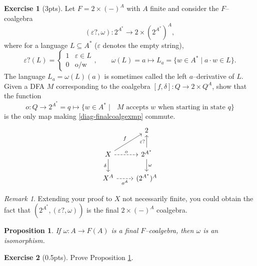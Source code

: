 \documentclass{article}
\newtheorem{prop}[thm]{Proposition}
\theoremstyle{definition}
\newtheorem{exer}{Exercise}
\theoremstyle{remark}
\newtheorem{rem}[thm]{Remark}
\begin{document}
\begin{exer}[3pts]\label{exer-finalcoalg}
	 Let $F = 2\times (-)^A$ with $A$ finite and consider the $F$--coalgebra \[(\varepsilon?, \omega): 2^{A^*} \rightarrow 2\times (2^{A^*})^A,\]
	 where for a language $L \subseteq A^*$ ($\varepsilon$ denotes the empty string), \[\varepsilon?(L) = \begin{cases}1 & \varepsilon \in L\\0 & \text{o/w}\end{cases}, \quad \quad \omega(L) = a \mapsto L_a = \{w \in A^* \mid a \cdot w \in L\}.\] The language $L_a = \omega(L)(a)$ is sometimes called the left $a$--derivative of $L$. Given a DFA $M$ corresponding to the coalgebra $[f,\delta]: Q\rightarrow 2\times Q^A$, show that the function 
	 \[o: Q \rightarrow 2^{A^*} = q\mapsto \{w \in A^* \mid \text{ $M$ accepts $w$ when starting in state $q$}\}\] is the only map making \eqref{diag-finalcoalgexmp} commute. 
    \begin{equation}\label{diag-finalcoalgexmp}
    \centering
    \begin{tikzcd}
        & 2                                                     \\
        X \arrow[d, "\delta"'] \arrow[r, "o", dashed] \arrow[ru, "f"] & 2^{A^*} \arrow[d, "\omega"] \arrow[u, "\varepsilon?"] \\
        X^A \arrow[r, "o^A"', dashed]                               & (2^{A^*})^A                                          
    \end{tikzcd}
    \end{equation}
\end{exer}
\begin{rem}
    Extending your proof to $X$ not necessarily finite, you could obtain the fact that $(2^{A^*}, (\varepsilon?, \omega))$ is the final $2\times (-)^A$ coalgebra.
\end{rem}
\begin{prop}\label{prop-lambek}
    If $\omega: A \rightarrow F(A)$ is a final $F$--coalgebra, then $\omega$ is an isomorphism.
\end{prop}
\begin{exer}[0.5pts]
    Prove Proposition \ref{prop-lambek}.
\end{exer}
\end{document}
